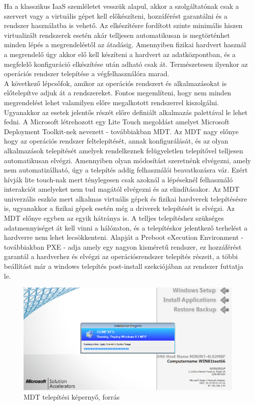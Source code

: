 \documentclass[12pt,oneside,justify,table]{book}
\begin{document}
Ha a klasszikus IaaS szemléletet vesszük alapul, akkor a szolgáltatónak csak a szervert vagy a virtuális gépet kell előkészíteni, hozzáférést garantálni és a rendszer használatba is vehető. Az elkészítésre fordított szinte minimális hiszen virtualizált rendszerek esetén akár telljesen automatikusan is megtörténhet minden lépés a megrendeléstől az átadásig. Amennyiben fizikai hardvert használ a megrendelő úgy akkor elő kell készíteni a hardvert az adatközpontban, és a megfelelő konfiguráció elkészítése után adható csak át. Természetesen ilyenkor az operációs rendszer telepítése a végfelhasználóra marad. \\

A következő lépcsőfok, amikor az operációs rendszert és alkalmazásokat is előtelepítve adjuk át a rendszereket. Fontos megemlíteni, hogy nem minden megrendelést lehet valamilyen előre megalkotott rendszerrel kiszolgálni. Ugyanakkor az esetek jelentős részét előre definiált alkalmazás palettával le lehet fedni. A Microsoft létrehozott egy Lite Touch megoldást amelyet Microsoft Deployment Toolkit-nek nevezett - továbbiakban MDT. Az MDT nagy előnye hogy az operációs rendszer feltelepítését, annak konfigurálását, és az olyan alkalmazások telepítését amelyek rendelkeznek felügyeletlen telepítővel telljesen automatikusan elvégzi. Amennyiben olyan módosítást szeretnénk elvégezni, amely nem automatizálható, úgy a telepítés addig felhasználói beavatkozásra vár. Ezért hívják lite touch-nak mert ténylegesen csak azoknál a lépéseknél felhasználó interakciót amelyeket nem tud magától elvégezni és az elindításakor. Az MDT univerzális eszköz mert alkalmas virtuális gépek és fizikai hardverek telepítésésre is, ugyanakkor a fizikai gépek esetén még a driverek telepítését is elvégzi. Az MDT előnye egyben az egyik hátránya is. A telljes telepítéshez szükséges adatmennyiséget át kell vinni a hálózaton, és a telepítéskor jelentkező terhelést a hardverre nem lehet lecsökkenteni. Alapját a Preboot eXecution Environment - továbbiakban PXE - adja amely egy nagyon kisméretű rendszer, ez hozzáférést garantál a hardverhez és elvégzi az operációsrendszer telepítés részeit, a többi beállítást már a windows telepítés post-install szekciójában az rendszer futtatja le.  \\
\begin{figure}[ht]
\centering
\includegraphics[width=1\textwidth]{mdt.png}
\caption{MDT telepítési képernyő, forrás \cite{MDTImage}}
\label{fig:mdt_image}
\end{figure}
\end{document}
